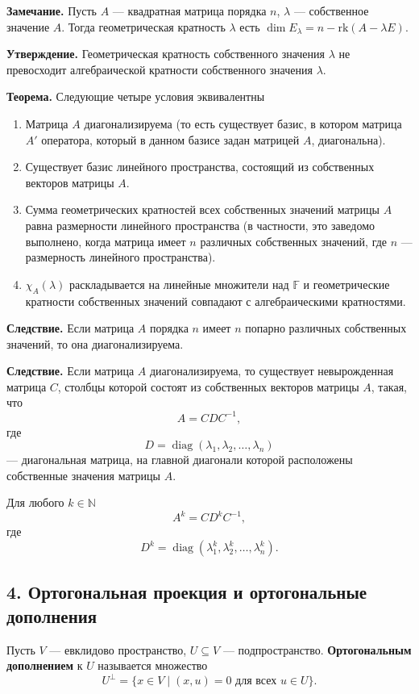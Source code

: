 \noindent\textbf{Замечание.} Пусть $A$ — квадратная матрица порядка $n$, $\lambda$ — собственное значение $A$. Тогда геометрическая кратность $\lambda$ есть $\dim E_\lambda = n - \mathrm{rk}(A - \lambda E)$.

\noindent\textbf{Утверждение.} Геометрическая кратность собственного значения $\lambda$ не превосходит алгебраической кратности собственного значения $\lambda$.

\noindent\textbf{Теорема.} Следующие четыре условия эквивалентны

\begin{enumerate}
    \item[1)] Матрица $A$ диагонализируема (то есть существует базис, в котором матрица $A'$ оператора, который в данном базисе задан матрицей $A$, диагональна).
    \item[2)] Существует базис линейного пространства, состоящий из собственных векторов матрицы $A$.
    \item[3)] Сумма геометрических кратностей всех собственных значений матрицы $A$ равна размерности линейного пространства (в частности, это заведомо выполнено, когда матрица имеет $n$ различных собственных значений, где $n$ — размерность линейного пространства).
    \item[4)] $\chi_A(\lambda)$ раскладывается на линейные множители над $\mathbb{F}$ и геометрические кратности собственных значений совпадают с алгебраическими кратностями.
\end{enumerate}

\noindent\textbf{Следствие.} Если матрица $A$ порядка $n$ имеет $n$ попарно различных собственных значений, то она диагонализируема.

\noindent\textbf{Следствие.} Если матрица $A$ диагонализируема, то существует невырожденная матрица $C$, столбцы которой состоят из собственных векторов матрицы $A$, такая, что
\[
A=CDC^{-1},
\]
где
\[
D=\operatorname{diag}(\lambda_1,\lambda_2,\ldots,\lambda_n)
\]
— диагональная матрица, на главной диагонали которой расположены собственные значения матрицы $A$.

Для любого $k\in\mathbb N$
\[
A^k=CD^kC^{-1},
\]
где
\[
D^k=\operatorname{diag}(\lambda_1^k,\lambda_2^k,\ldots,\lambda_n^k).
\]

\subsection*{4. Ортогональная проекция и ортогональные дополнения}

\begin{definition}
Пусть $V$ — евклидово пространство, $U \subseteq V$ — подпространство. 
\textbf{Ортогональным дополнением} к $U$ называется множество
\[
U^\perp = \{x \in V \mid (x,u)=0 \text{ для всех } u \in U\}.
\]
\end{definition}

